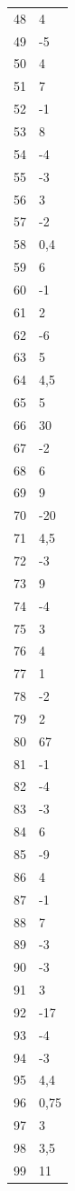 {\begin{longtable}[]{@{}ll@{}}
48 & 4 \\
49 & -5 \\
50 & 4 \\
51 & 7 \\
52 & -1 \\
53 & 8 \\
54 & -4 \\
55 & -3 \\
56 & 3 \\
57 & -2 \\
58 & 0,4 \\
59 & 6 \\
60 & -1 \\
61 & 2 \\
62 & -6 \\
63 & 5 \\
64 & 4,5 \\
65 & 5 \\
66 & 30 \\
67 & -2 \\
68 & 6 \\
69 & 9 \\
70 & -20 \\
71 & 4,5 \\
72 & -3 \\
73 & 9 \\
74 & -4 \\
75 & 3 \\
76 & 4 \\
77 & 1 \\
78 & -2 \\
79 & 2 \\
80 & 67 \\
81 & -1 \\
82 & -4 \\
83 & -3 \\
84 & 6 \\
85 & -9 \\
86 & 4 \\
87 & -1 \\
88 & 7 \\
89 & -3 \\
90 & -3 \\
91 & 3 \\
92 & -17 \\
93 & -4 \\
94 & -3 \\
95 & 4,4 \\
96 & 0,75 \\
97 & 3 \\
98 & 3,5 \\
99 & 11 \\
\end{longtable}
}

